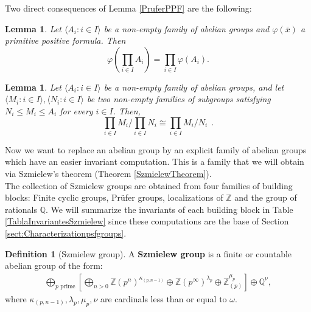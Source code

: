 \documentclass[11pt]{amsart}
\newtheorem{lema}[prop]{Lemma}
\theoremstyle{definition}
\newtheorem{definicion}[prop]{Definition}
\newcommand{\bd}{\begin{definicion}}
\newcommand{\ed}{\end{definicion}}
\newcommand{\bl}{\begin{lema}}
\newcommand{\el}{\end{lema}}
\newcommand{\Z}{\mathbb{Z}}
\newcommand{\Q}{\mathbb{Q}}
\newcommand{\ov}[1]{\overline{#1}}
\begin{document}
Two direct consequences of Lemma \ref{PruferPPF} are the following:
\bl \label{ConmutacionPPFormulaProducto}Let $\langle A_i:i\in I\rangle$ be a non-empty family of abelian groups and $\varphi(\ov{x})$ a primitive positive formula. Then
\[\varphi\left(\prod_{i\in I}A_i\right)=\prod_{i\in I}\varphi(A_i).\]
\el

\bl \label{ConmutacionCocienteProducto} Let $\langle A_i:i\in I\rangle$ be a non-empty family of abelian groups, and let $\langle M_i:i\in I\rangle,\langle N_i:i\in I\rangle$ be two non-empty families of subgroups satisfying $N_i\leq M_i\leq A_i$ for every $i\in I$. Then,
\[\prod_{i\in I}M_i\Big/\prod_{i\in I}N_i\cong \prod_{i\in I}M_i/N_i\ \ .\]
\el

Now we want to replace an abelian group by an explicit family of abelian groups which have an easier invariant computation. This is a family that we will obtain via Szmielew's theorem (Theorem \ref{SzmielewTheorem}).\\

The collection of Szmielew groups are obtained from four families of building blocks: Finite cyclic groups, Pr\"ufer groups, localizations of $\Z$ and the group of rationals $\Q$. We will summarize the invariants of each building block in Table \ref{TablaInvariantesSzmielew} since these computations are the base of Section \ref{sect:Characterizationpsfgroups}.
\bd[Szmielew group] \label{SzmielewGroupDefinition} A \textbf{Szmielew group} is a finite or countable abelian group of the form:
\begin{align*}
    \bigoplus_{p \text{ prime}} \left[ \bigoplus_{n>0} \mathbb{Z}(p^{n})^{\kappa_{(p,n-1)}} \oplus \mathbb{Z}(p^{\infty})^{\lambda_{p}} \oplus \mathbb{Z}^{\mu_p}_{(p)} \right] \oplus \mathbb{Q}^{\nu},
\end{align*}
where $\kappa_{(p,n-1)},\lambda_{p},\mu_{p},\nu$ are cardinals less than or equal to $\omega$.
\ed
\end{document}
